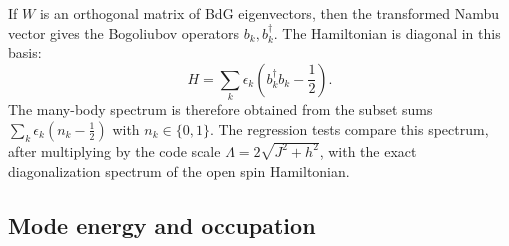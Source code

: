 If $W$ is an orthogonal matrix of BdG eigenvectors, then the transformed Nambu vector gives the Bogoliubov operators $b_k,b_k^\dagger$.  The Hamiltonian is diagonal in this basis:
\begin{equation}
    H = \sum_k \epsilon_k \left(b_k^\dagger b_k - \frac{1}{2}\right).
\end{equation}
The many-body spectrum is therefore obtained from the subset sums $\sum_k \epsilon_k(n_k-\frac12)$ with $n_k\in\{0,1\}$.  The regression tests compare this spectrum, after multiplying by the code scale $\Lambda=2\sqrt{J^2+h^2}$, with the exact diagonalization spectrum of the open spin Hamiltonian.

\subsection{Mode energy and occupation}


